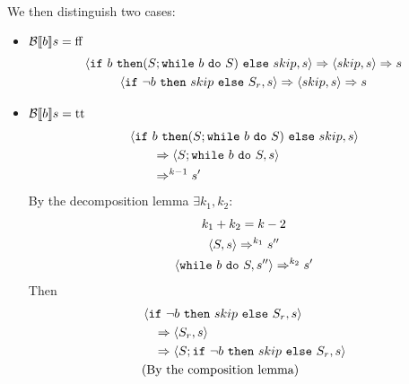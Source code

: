 \begin{exercise}
\begin{itemize}
\begin{itemize}
\begin{align*}
                \end{align*}
                We then distinguish two cases:
                \begin{itemize}
                    \item $\mathcal{B} \llbracket  b \rrbracket s = \text{ff}$
                    \begin{gather*}
                        \instr{\texttt{if}\ b\ \texttt{then} (S; \texttt{while}\ b\ \texttt{do}\ S)\ \texttt{else}\ skip}{s}
                        \Rightarrow
                        \instr{skip}{s}
                        \Rightarrow s
                        \\
                        \instr{\texttt{if}\ \neg b\ \texttt{then}\ skip\ \texttt{else}\ S_r}{s}
                        \Rightarrow
                        \instr{skip}{s}
                        \Rightarrow s
                    \end{gather*}
                    \item $\mathcal{B} \llbracket  b \rrbracket s = \text{tt}$
                        \begin{align*}
                            &\left<\texttt{if}\ b\ \texttt{then} (S; \texttt{while}\ b\ \texttt{do}\ S)\ \texttt{else}\ skip, s\right>
                            \\&\qquad\Rightarrow \left<S; \texttt{while}\ b\ \texttt{do}\ S, s\right>
                            \\&\qquad\Rightarrow^{k-1} s'
                        \end{align*}
                        By the decomposition lemma $\exists k_1, k_2 :$
                        \begin{gather*}
                            k_1 + k_2 = k - 2 \\
                            \instr{S}{s} \Rightarrow^{k_1} s'' \\
                            \instr{\texttt{while}\ b\ \texttt{do}\ S}{s''} \Rightarrow^{k_2} s'
                        \end{gather*}
                        Then
                        \begin{align*}
                            &\instr{\texttt{if}\ \neg b\ \texttt{then}\ skip\ \texttt{else}\ S_r}{s}
                            \\&\quad\Rightarrow \instr{S_r}{s}
                            \\&\quad\Rightarrow \instr{S; \texttt{if}\ \neg b\ \texttt{then}\ skip\ \texttt{else}\ S_r}{s}
                            \\&\text{(By the composition lemma)}

\end{align*}
\end{itemize}
\end{itemize}
\end{itemize}
\end{exercise}

